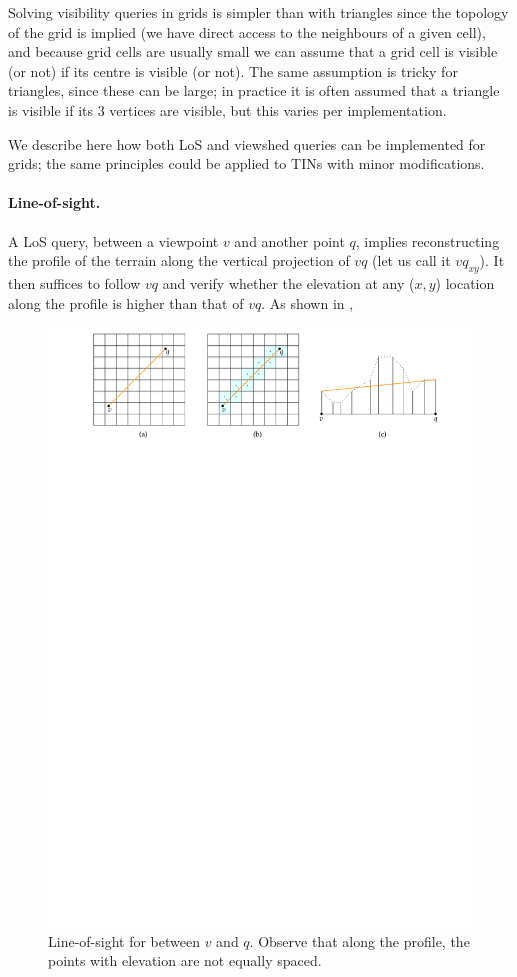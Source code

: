 Solving visibility queries in grids is simpler than with triangles since the topology of the grid is implied (we have direct access to the neighbours of a given cell), and because grid cells are usually small we can assume that a grid cell is visible (or not) if its centre is visible (or not).
The same assumption is tricky for triangles, since these can be large; in practice it is often assumed that a triangle is visible if its 3 vertices are visible, but this varies per implementation.

%

We describe here how both LoS and viewshed queries can be implemented for grids; the same principles could be applied to TINs with minor modifications.


\paragraph{Line-of-sight.}
A LoS query, between a viewpoint $v$ and another point $q$, implies reconstructing the profile of the terrain along the vertical projection of $vq$ (let us call it $vq_{xy}$).
It then suffices to follow $vq$ and verify whether the elevation at any ($x,y$) location along the profile is higher than that of $vq$.
As shown in , 
\begin{figure}
  \centering
  \includegraphics[width=\linewidth]{figs/los}
  \caption{Line-of-sight for between $v$ and $q$. Observe that along the profile, the points with elevation are not equally spaced.}%
\end{figure}
